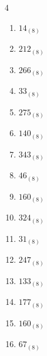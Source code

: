 \begin{multicols}{4}
\begin{enumerate}
  \item $14_{(8)}$

        \phantom{$=12$}

  \item $212_{(8)}$

        \phantom{$=138$}

  \item $266_{(8)}$

        \phantom{$=182$}

  \item $33_{(8)}$

        \phantom{$=27$}

  \item $275_{(8)}$

        \phantom{$=189$}

  \item $140_{(8)}$

        \phantom{$=96$}

  \item $343_{(8)}$

        \phantom{$=227$}

  \item $46_{(8)}$

        \phantom{$=38$}

  \item $160_{(8)}$

        \phantom{$=112$}

  \item $324_{(8)}$

        \phantom{$=212$}

  \item $31_{(8)}$

        \phantom{$=25$}

  \item $247_{(8)}$

        \phantom{$=167$}

  \item $133_{(8)}$

        \phantom{$=91$}

  \item $177_{(8)}$

        \phantom{$=127$}

  \item $160_{(8)}$

        \phantom{$=112$}

\columnbreak %

  \item $67_{(8)}$


\end{enumerate}
\end{multicols}
